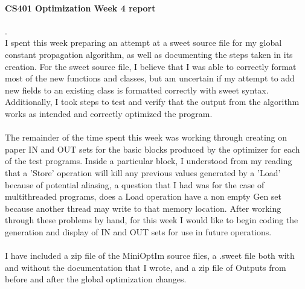 \documentclass[14pt]{article}
\author{Joel Anna<annajoel@pdx.edu>}
\begin{document}
\paragraph{CS401 Optimization Week 4 report} 
.\\
I spent this week preparing an attempt at a sweet source file for my global constant propagation algorithm, as well as documenting the steps taken in its creation. For the sweet source file, I believe that I was able to correctly format most of the new functions and classes, but am uncertain if my attempt to add new fields to an existing class is formatted correctly with sweet syntax. Additionally, I took steps to test and verify that the output from the algorithm works as intended and correctly optimized the program.
\paragraph{}
The remainder of the time spent this week was working through creating on paper IN and OUT sets for the basic blocks produced by the optimizer for each of the test programs. Inside a particular block, I understood from my reading that a 'Store' operation will kill any previous values generated by a 'Load' because of potential aliasing, a question that I had was for the case of multithreaded programs, does a Load operation have a non empty Gen set because another thread may write to that memory location.
After working through these problems by hand, for this week I would like to begin coding the generation and display of IN and OUT sets for use in future operations.
\paragraph{}
I have included a zip file of the MiniOptIm source files, a .sweet file both with and without the documentation that I wrote, and a zip file of Outputs from before and after the global optimization changes.
\end{document}
